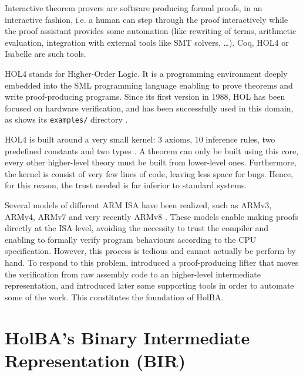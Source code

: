 \documentclass{kththesis}
\begin{document}
Interactive theorem provers are software producing formal proofs, in an
interactive fashion, i.e. a human can step through the proof interactively while the proof assistant provides some automation (like rewriting of terms, arithmetic evaluation, integration with external tools like SMT solvers, \dots). Coq, HOL4 or Isabelle are such tools.

HOL4 \cite{noauthor_hol_nodate} stands for Higher-Order Logic. It is a programming environment deeply embedded into the \gls{SML} programming language enabling to prove theorems and write \gls{proof-producing} programs. Since its first version in 1988, HOL has been focused on hardware verification, and has been successfully used in this domain, as shows its \texttt{examples/} directory \cite{noauthor_canonical_2019}.

HOL4 is built around a very small kernel: 3 axioms, 10 inference rules, two predefined constants and two types \footnotemark \cite{tuerk_interactive_nodate}. A theorem can only be built using this core, every other higher-level theory must be built from lower-level ones. Furthermore, the kernel is consist of very few lines of code, leaving less space for bugs. Hence, for this reason, the trust needed is far inferior to standard systems.


Several models of different ARM \gls{ISA} have been realized, such as ARMv3, ARMv4, ARMv7 \cite{noauthor_canonical_2019, hutchison_trustworthy_2010} and very recently ARMv8 \cite{armstrong_isa_2019}. These models enable making proofs directly at the ISA level, avoiding the necessity to trust the compiler and enabling to formally verify program behaviours according to the CPU specification. However, this process is tedious and cannot actually be perform by hand. To respond to this problem, \cite{metere_sound_2017} introduced a proof-producing lifter that moves the verification from raw assembly code to an higher-level intermediate representation, and introduced later some supporting tools \cite{lindner_trabin:_2019} in order to automate some of the work. This constitutes the foundation of HolBA.

\section{HolBA's Binary Intermediate Representation (BIR)} \label{bir-presentation}
\end{document}
